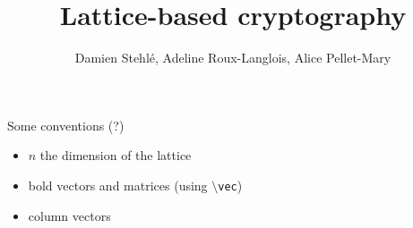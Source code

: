 \documentclass[a4paper,11pt]{article}
\title{Lattice-based cryptography}
\author{Damien Stehlé, Adeline Roux-Langlois, Alice Pellet-Mary}
\theoremstyle{definition}
\begin{document}
\maketitle

Some conventions (?)
\begin{itemize}
\item $n$ the dimension of the lattice
\item bold vectors and matrices (using \texttt{$\setminus$vec})
\item column vectors
\end{itemize}

\tableofcontents







\end{document}
